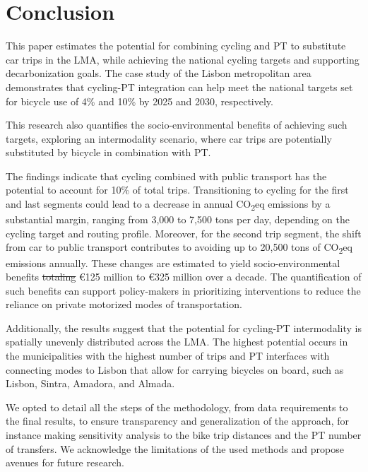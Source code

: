 \documentclass[review, doubleblind, 3p,
authoryear]{elsarticle} %
\providecommand{\DIFaddtex}[1]{{\protect\color{blue}\uwave{#1}}} %
\providecommand{\DIFdeltex}[1]{{\protect\color{red}\sout{#1}}}                      %
\providecommand{\DIFaddbegin}{} %
\providecommand{\DIFaddend}{} %
\providecommand{\DIFdelbegin}{} %
\providecommand{\DIFdelend}{} %
\providecommand{\DIFadd}[1]{\texorpdfstring{\DIFaddtex{#1}}{#1}} %
\providecommand{\DIFdel}[1]{\texorpdfstring{\DIFdeltex{#1}}{}} %
\newcommand{\DIFscaledelfig}{0.5}
\newlength{\DIFdelgraphicswidth} %
\newlength{\DIFdelgraphicsheight} %
\newcommand{\DIFaddincludegraphics}[2][]{{\color{blue}\fbox{\DIFOincludegraphics[#1]{#2}}}} %
\newcommand{\DIFdelincludegraphics}[2][]{%
\sbox{\DIFdelgraphicsbox}{\DIFOincludegraphics[#1]{#2}}%
\settoboxwidth{\DIFdelgraphicswidth}{\DIFdelgraphicsbox} %
\settoboxtotalheight{\DIFdelgraphicsheight}{\DIFdelgraphicsbox} %
\scalebox{\DIFscaledelfig}{%
\parbox[b]{\DIFdelgraphicswidth}{\usebox{\DIFdelgraphicsbox}\\[-\baselineskip] \rule{\DIFdelgraphicswidth}{0em}}\llap{\resizebox{\DIFdelgraphicswidth}{\DIFdelgraphicsheight}{%
\setlength{\unitlength}{\DIFdelgraphicswidth}%
\begin{picture}(1,1)%
\thicklines\linethickness{2pt} %
{\color[rgb]{1,0,0}\put(0,0){\framebox(1,1){}}}%
{\color[rgb]{1,0,0}\put(0,0){\line( 1,1){1}}}%
{\color[rgb]{1,0,0}\put(0,1){\line(1,-1){1}}}%
\end{picture}%
}\hspace*{3pt}}} %
} %
\DeclareRobustCommand{\DIFaddbegin}{\DIFOaddbegin \let\includegraphics\DIFaddincludegraphics} %
\DeclareRobustCommand{\DIFaddend}{\DIFOaddend \let\includegraphics\DIFOincludegraphics} %
\DeclareRobustCommand{\DIFdelbegin}{\DIFOdelbegin \let\includegraphics\DIFdelincludegraphics} %
\DeclareRobustCommand{\DIFdelend}{\DIFOaddend \let\includegraphics\DIFOincludegraphics} %
\begin{document}
\section{Conclusion}\label{Conclusions}

This paper estimates the potential for combining cycling and PT to
substitute car trips in the LMA, while achieving the national cycling
targets and supporting decarbonization goals. The case study of the
Lisbon metropolitan area demonstrates that cycling-PT integration can
help meet the national targets set for bicycle use of 4\% and 10\% by
2025 and 2030, respectively.

This research also quantifies the socio-environmental benefits of
achieving such targets, exploring an intermodality scenario, where car
trips are potentially substituted by bicycle in combination with PT.

The findings indicate that cycling combined with public transport has
the potential to account for 10\% of total trips. Transitioning to
cycling for the first and last segments could lead to a decrease in
annual CO\textsubscript{2}eq emissions by a substantial margin, ranging
from 3,000 to 7,500 tons per day, depending on the cycling target and
routing profile. Moreover, for the second trip segment, the shift from
car to public transport contributes to avoiding up to 20,500 tons of
CO\textsubscript{2}eq emissions annually. These changes are estimated to
yield socio-environmental benefits \DIFdelbegin \DIFdel{totaling }\DIFdelend \DIFaddbegin \DIFadd{totalling }\DIFaddend €125 million to €325
million over a decade. The quantification of such benefits can support
policy-makers in prioritizing interventions to reduce the reliance on
private motorized modes of transportation.

Additionally, the results suggest that the potential for cycling-PT
intermodality is spatially unevenly distributed across the LMA. The
highest potential occurs in the municipalities with the highest number
of trips and PT interfaces with connecting modes to Lisbon that allow
for carrying bicycles on board, such as Lisbon, Sintra, Amadora, and
Almada.

We opted to detail all the steps of the methodology, from data
requirements to the final results, to ensure transparency and
generalization of the approach, for instance making sensitivity analysis
to the bike trip distances and the PT number of transfers. We
acknowledge the limitations of the used methods and propose avenues for
future research.
\end{document}
